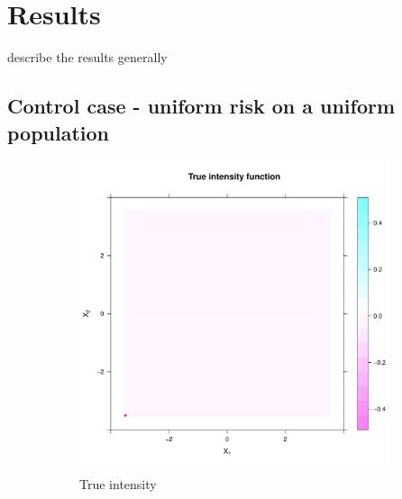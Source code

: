 
\section{Results}

describe the results generally

\subsection{Control case - uniform risk on a uniform population}



\begin{figure}[tb]
    \centering
    \begin{subfigure}[t]{0.45\textwidth}
    \includegraphics[width=\textwidth]{results/unif_100_1_unif/output/true_intensity_heatmap}
    \caption{True intensity}
    \end{subfigure}
    \begin{subfigure}[t]{0.45\textwidth}

\end{subfigure}
\end{figure}
